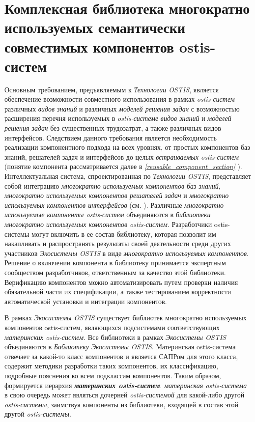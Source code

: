 \section{Комплексная библиотека многократно используемых семантически совместимых компонентов ostis-систем}
\label{ostis_library_section}

Основным требованием, предъявляемым к \textit{Технологии OSTIS}, является обеспечение возможности совместного использования в рамках \textit{ostis-систем} различных \textit{видов знаний} и различных \textit{моделей решения задач} с возможностью  расширения перечня используемых в \textit{ostis-системе} \textit{видов знаний} и \textit{моделей решения задач} без существенных трудозатрат, а также различных видов интерфейсов. Следствием данного требования является необходимость реализации компонентного подхода на всех уровнях, от простых компонентов баз знаний, решателей задач и интерфейсов до целых \textit{встраиваемых ostis-систем} (понятие компонента рассматривается далее в \textit{\ref{reusable_component_section} }). Интеллектуальная система, спроектированная по \textit{Технологии OSTIS}, представляет собой интеграцию \textit{многократно используемых компонентов баз знаний}, \textit{многократно используемых компонентов решателей задач} и \textit{многократно используемых компонентов интерфейсов} (см. ). Различные \textit{многократно используемые компоненты ostis-систем} объединяются в \textit{библиотеки многократно используемых компонентов ostis-систем}. Разработчики  ostis-системы могут включить в ее состав библиотеку, которая позволит им накапливать и распространять результаты своей деятельности среди других участников \textit{Экосистемы OSTIS} в виде \textit{многократно используемых компонентов}. Решение о включении компонента в библиотеку принимается экспертным сообществом разработчиков, ответственным за качество этой библиотеки. Верификацию компонентов можно автоматизировать путем проверки наличия обязательной части их спецификации, а также тестированием корректности автоматической установки и интеграции компонентов.

В рамках \textit{Экосистемы OSTIS} существует  библиотек многократно используемых компонентов ostis-систем, являющихся подсистемами соответствующих \textit{материнских ostis-систем}. Все библиотеки в рамках \textit{Экосистемы OSTIS} объединяются в \textit{Библиотеку Экосистемы OSTIS}. Материнская ostis-система отвечает за какой-то класс компонентов и является САПРом для этого класса, содержит методики разработки таких компонентов, их классификацию, подробные пояснения ко всем подклассам компонентов. Таким образом, формируется иерархия \textbf{\textit{материнских ostis-систем}}. \textit{материнская ostis-система} в свою очередь может являться дочерней \textit{ostis-системой} для какой-либо другой \textit{ostis-системы}, заимствуя компоненты из библиотеки, входящей в состав этой другой \textit{ostis-системы}.

